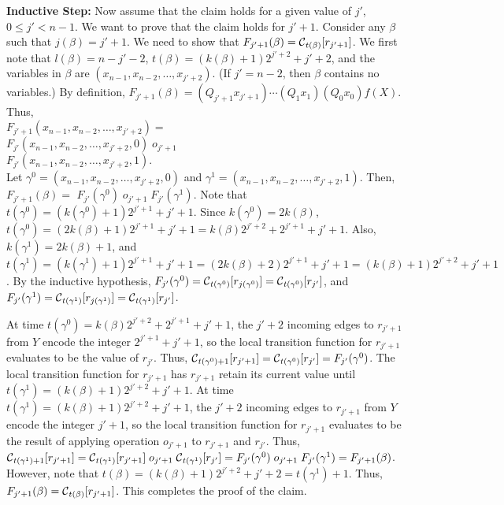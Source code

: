 \smallskip
\noindent
{\bf Inductive Step:} 
Now assume that the claim holds for a given value of $j'$, $0 \leq j' < n-1$.
We want to prove that the claim holds for $j'+1$.
Consider any $\beta$ such that $j(\beta) = j'+1$.
We need to show that $F_{j'+1}(\beta) = \mbox{$\mathcal{C}$}_{t(\beta)}[r_{j'+1}]$.
We first note that $l(\beta) = n-j'-2$, 
$t(\beta) = (k(\beta) + 1)2^{j'+2}+j'+2$,
and the variables in $\beta$ are $(x_{n-1}, x_{n-2}, \ldots , x_{j'+2})$.
(If $j' = n-2$, then $\beta$ contains no variables.)
By definition, 
$F_{j'+1}(\beta) =  (Q_{j'+1} x_{j'+1}) \cdots (Q_1 x_1) (Q_0 x_0) f(X)$.
Thus,\\
$F_{j'+1}(x_{n-1}, x_{n-2}, \ldots , x_{j'+2}) = $\\
\hspace*{0.1in}
$F_{j'}(x_{n-1}, x_{n-2}, \ldots , x_{j'+2}, 0) \; o_{j'+1} \;$\\
\hspace*{0.1in} $F_{j'}(x_{n-1}, x_{n-2}, \ldots , x_{j'+2}, 1).$\\
Let $\gamma^0 = (x_{n-1}, x_{n-2}, \ldots , x_{j'+2}, 0)$
and $\gamma^1 = (x_{n-1}, x_{n-2}, \ldots , x_{j'+2}, 1)$.
Then, $F_{j'+1}(\beta) =$  
$F_{j'}(\gamma^0) \; o_{j'+1} \; F_{j'}(\gamma^1)$.
Note that
$t(\gamma^0) = (k(\gamma^0)+1)2^{j'+1}+j'+1$.
Since $k(\gamma^0)= 2k(\beta)$,
$t(\gamma^0) = (2k(\beta)+1)2^{j'+1}+j'+1 = k(\beta)2^{j'+2}+2^{j'+1}+j'+1$.
Also, $k(\gamma^1)= 2k(\beta)+1$, and
$t(\gamma^1) = (k(\gamma^1)+1)2^{j'+1}+j'+1= 
(2k(\beta)+2)2^{j'+1}+j'+1 =  (k(\beta)+1)2^{j'+2}+j'+1$.
By the inductive hypothesis,
$F_{j'}(\gamma^0) = \mbox{$\mathcal{C}$}_{t(\gamma^0)}[r_{j(\gamma^0)}] = \mbox{$\mathcal{C}$}_{t(\gamma^0)}[r_{j'}]$,
and $F_{j'}(\gamma^1) = \mbox{$\mathcal{C}$}_{t(\gamma^1)}[r_{j(\gamma^1)}] = \mbox{$\mathcal{C}$}_{t(\gamma^1)}[r_{j'}]$.

At time $t(\gamma^0) = k(\beta)2^{j'+2}+2^{j'+1}+j'+1$,
the $j'+2$ incoming edges to $r_{j'+1}$ from $Y$ encode the integer $2^{j'+1}+j'+1$,
so the local transition function for $r_{j'+1}$ evaluates to be the value of $r_{j'}$.
Thus, $\mbox{$\mathcal{C}$}_{t(\gamma^0)+1}[r_{j'+1}] = \mbox{$\mathcal{C}$}_{t(\gamma^0)}[r_{j'}] = F_{j'}(\gamma^0)$.
The local transition function for $r_{j'+1}$ has $r_{j'+1}$ retain its current value until 
$t(\gamma^1) = (k(\beta)+1)2^{j'+2}+j'+1$.
At time $t(\gamma^1) =  (k(\beta)+1)2^{j'+2}+j'+1$,
the $j'+2$ incoming edges to $r_{j'+1}$ from $Y$ encode the integer $j'+1$,
so the local transition function for $r_{j'+1}$ evaluates to be the result
of applying operation $o_{j'+1}$ to  $r_{j'+1}$ and $r_{j'}$.
Thus, 
$\mbox{$\mathcal{C}$}_{t(\gamma^1)+1}[r_{j'+1}] = 
 \mbox{$\mathcal{C}$}_{t(\gamma^1)}[r_{j'+1}]  \; o_{j'+1} \; \mbox{$\mathcal{C}$}_{t(\gamma^1)}[r_{j'}] 
= F_{j'}(\gamma^0)  \; o_{j'+1} \; F_{j'}(\gamma^1) = F_{j'+1}(\beta)$.
However, note that $t(\beta) = (k(\beta) + 1)2^{j'+2}+j'+2 =  t(\gamma^1)+1$.
Thus, $F_{j'+1}(\beta) = \mbox{$\mathcal{C}$}_{t(\beta)}[r_{j'+1}]$.
This completes the proof of the claim.

